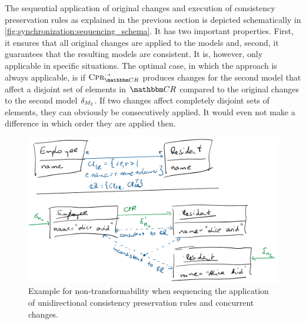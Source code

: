 The sequential application of original changes and execution of consistency preservation rules as explained in the previous section is depicted schematically in \autoref{fig:synchronization:sequencing_schema}.
It has two important properties. 
First, it ensures that all original changes are applied to the models and, second, it guarantees that the resulting models are consistent.
It is, however, only applicable in specific situations.
The optimal case, in which the approach is always applicable, is if $\consistencypreservationrule{\consistencyrelationset{CR}}^{\rightarrow}$ produces changes for the second model that affect a disjoint set of elements in $\consistencyrelationset{CR}$ compared to the original changes to the second model $\change{\metamodel{M}{2}}$.
If two changes affect completely disjoint sets of elements, they can obviously be consecutively applied.
It would even not make a difference in which order they are applied then.

\begin{figure}
    \centering
    \includegraphics[width=\textwidth]{figures/correctness/synchronization/non_transformability.png}
    \caption[Non-transformability in sequencing scenario]{Example for non-transformability when sequencing the application of unidirectional consistency preservation rules and concurrent changes.}
    \label{fig:synchronization:non_transformability}
\end{figure}

